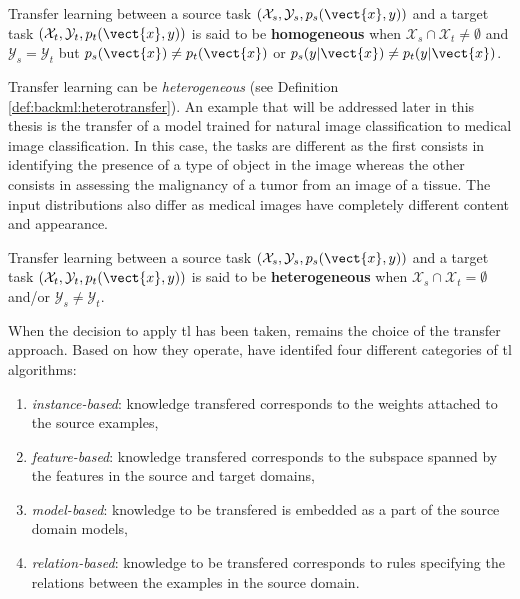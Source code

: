 \begin{definition}
\label{def:backml:homotransfer}
Transfer learning between a source task $\left(\mathcal{X}_{s}, \mathcal{Y}_{s}, p_{s}(\vect{x}, y)\right)$ and a target task $\left(\mathcal{X}_t, \mathcal{Y}_t, p_t(\vect{x}, y)\right)$ is said to be \textbf{homogeneous} when $\mathcal{X}_s \cap \mathcal{X}_t \neq \emptyset$ and $\mathcal{Y}_s = \mathcal{Y}_t$ but $p_s(\vect{x}) \neq p_t(\vect{x})$ or $p_s(y|\vect{x}) \neq p_t(y|\vect{x})$. 
\end{definition}

Transfer learning can be \textit{heterogeneous} (see Definition \ref{def:backml:heterotransfer}). An example that will be addressed later in this thesis is the transfer of a model trained for natural image classification to medical image classification. In this case, the tasks are different as the first consists in identifying the presence of a type of object in the image whereas the other consists in assessing the malignancy of a tumor from an image of a tissue. The input distributions also differ as medical images have completely different content and appearance.  

\begin{definition}
\label{def:backml:heterotransfer}
Transfer learning between a source task $\left(\mathcal{X}_{s}, \mathcal{Y}_{s}, p_{s}(\vect{x}, y)\right)$ and a target task $\left(\mathcal{X}_t, \mathcal{Y}_t, p_t(\vect{x}, y)\right)$ is said to be \textbf{heterogeneous} when $\mathcal{X}_s \cap \mathcal{X}_t = \emptyset$ and/or $\mathcal{Y}_s \neq \mathcal{Y}_t$.
\end{definition}

When the decision to apply \acrlong{tl} has been taken, remains the choice of the transfer approach. Based on how they operate, \parencite{yang2020transfer} have identifed four different categories of \acrlong{tl} algorithms: 

\begin{enumerate}
  \item \textit{instance-based}: knowledge transfered corresponds to the weights attached to the source examples,
  \item \textit{feature-based}: knowledge transfered corresponds to the subspace spanned by the features in the source and target domains,
  \item \textit{model-based}: knowledge to be transfered is embedded as a part of the source domain models,
  \item \textit{relation-based}: knowledge to be transfered corresponds to rules specifying the relations between the examples in the source domain. 
\end{enumerate}

